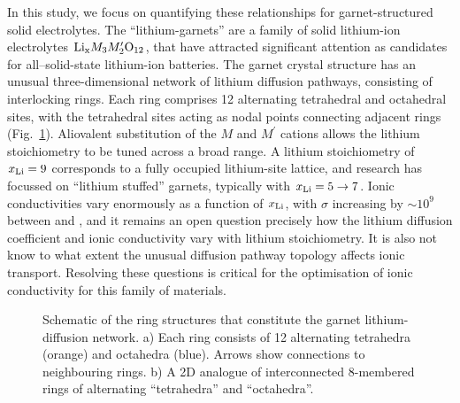 \documentclass[aps,prb,twocolumn,superscriptaddress,reprint]{revtex4-1}
\newcommand{\xLi}{x_\m{Li}}
\begin{document}
In this study, we focus on quantifying these relationships for garnet-structured solid electrolytes. The ``lithium-garnets'' are a family of solid lithium-ion electrolytes $\mathrm{Li}_{\mathrm{x}}M_3M^\prime_2\mathrm{O}_{12}$,\cite{ThangaduraiEtAl_JAmCeramSoc2003, ThangaduraiEtAl_JPhysChemLett2015} that have attracted significant attention as candidates for all--solid-state lithium-ion batteries.\cite{BachmanEtAl_ChemRev2016,InadaEtAl_FrontEnergyRes2016} The garnet crystal structure has an unusual three-dimensional network of lithium diffusion pathways, consisting of interlocking rings.\cite{AwakaEtAl_ChemLett2011} Each ring comprises 12 alternating tetrahedral and octahedral sites, with the tetrahedral sites acting as nodal points connecting adjacent rings (Fig.~\ref{fig:garnet_network_schematic}). 
Aliovalent substitution of the $M$ and $M^\prime$ cations allows the lithium stoichiometry to be tuned across a broad range. 
A lithium stoichiometry of $\xLi=9$ corresponds to a fully occupied lithium-site lattice, and research has focussed on ``lithium stuffed'' garnets, typically with $\xLi=5\to7$. 
Ionic conductivities vary enormously as a function of $\xLi$, with $\sigma$ increasing by $\sim10^9$ between  and ,\cite{ThangaduraiEtAl_JPhysChemLett2015, BachmanEtAl_ChemRev2016} and it remains an open question precisely how the lithium diffusion coefficient and ionic conductivity vary with lithium stoichiometry. It is also not know to what extent the unusual diffusion pathway topology affects ionic transport. Resolving these questions is critical for the optimisation of ionic conductivity for this family of materials.

\begin{figure}[tb]
  \centering
    \caption{\label{fig:garnet_network_schematic}Schematic of the ring structures that constitute the garnet lithium-diffusion network. a) Each ring consists of 12 alternating tetrahedra (orange) and octahedra (blue). 
Arrows show connections to neighbouring rings.\cite{AwakaEtAl_ChemLett2011} b) A 2D analogue of interconnected 8-membered rings of alternating ``tetrahedra'' and ``octahedra''.}
\end{figure}
\end{document}
